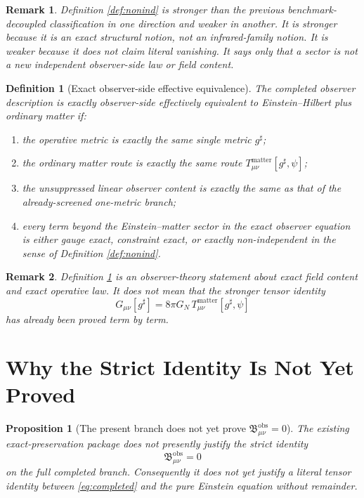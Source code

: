 \documentclass[11pt]{article}
\newcommand{\CompletedMetric}{g^{\sharp}}
\newcommand{\ObsBurden}{\mathfrak B_{\mu\nu}^{\mathrm{obs}}}
\newtheorem{definition}{Definition}
\newtheorem{proposition}{Proposition}
\newtheorem{remark}{Remark}
\begin{document}
\begin{remark}
Definition \ref{def:nonind} is stronger than the previous benchmark-decoupled classification in one direction and weaker in another. It is stronger because it is an exact structural notion, not an infrared-family notion. It is weaker because it does not claim literal vanishing. It says only that a sector is not a new independent observer-side law or field content.
\end{remark}

\begin{definition}[Exact observer-side effective equivalence]
\label{def:equiv}
The completed observer description is \emph{exactly observer-side effectively equivalent} to Einstein--Hilbert plus ordinary matter if:
\begin{enumerate}
    \item the operative metric is exactly the same single metric \(\CompletedMetric\);
    \item the ordinary matter route is exactly the same route \(T_{\mu\nu}^{\mathrm{matter}}[\CompletedMetric,\psi]\);
    \item the unsuppressed linear observer content is exactly the same as that of the already-screened one-metric branch;
    \item every term beyond the Einstein--matter sector in the exact observer equation is either gauge exact, constraint exact, or exactly non-independent in the sense of Definition \ref{def:nonind}.
\end{enumerate}
\end{definition}

\begin{remark}
Definition \ref{def:equiv} is an observer-theory statement about exact field content and exact operative law. It does \emph{not} mean that the stronger tensor identity
\[
G_{\mu\nu}[\CompletedMetric]
=
8\pi G_N\,T_{\mu\nu}^{\mathrm{matter}}[\CompletedMetric,\psi]
\]
has already been proved term by term.
\end{remark}

\section{Why the Strict Identity Is Not Yet Proved}

\begin{proposition}[The present branch does not yet prove \texorpdfstring{\(\ObsBurden=0\)}{ObsBurden=0}]
\label{prop:nozero}
The existing exact-preservation package does not presently justify the strict identity
\begin{equation}
\ObsBurden=0
\label{eq:nozero}
\end{equation}
on the full completed branch. Consequently it does not yet justify a literal tensor identity between \eqref{eq:completed} and the pure Einstein equation without remainder.
\end{proposition}
\end{document}
